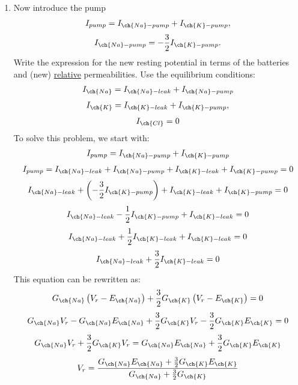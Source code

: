 \documentclass[11pt]{article}
\begin{document}
\begin{enumerate}[label=\arabic*.]
\begin{enumerate}[label=(\alph*)]
\newpage
\item
Now introduce the pump
\begin{align*}
I_{pump} = I_{\ch{Na}-pump} + I_{\ch{K}-pump},
\end{align*}
\begin{align*}
I_{\ch{Na}-pump} =  -\frac{3} {2} I_{\ch{K}-pump}.
\end{align*}
Write the expression for the new resting potential in terms of the batteries and (new) \underline{relative} permeabilities. Use the equilibrium conditions:
\begin{align*}
I_{\ch{Na}} = I_{\ch{Na}-leak} + I_{\ch{Na}-pump}
\end{align*}
\begin{align*}
I_{\ch{K}} = I_{\ch{K}-leak} + I_{\ch{K}-pump},
\end{align*}
\begin{align*}
I_{\ch{Cl}} = 0
\end{align*}
To solve this problem, we start with:
\begin{align*}
I_{pump} = I_{\ch{Na}-pump} + I_{\ch{K}-pump}
\end{align*}
\begin{align*}
I_{pump} = I_{\ch{Na}-leak} + I_{\ch{Na}-pump} + I_{\ch{K}-leak} + I_{\ch{K}-pump} = 0
\end{align*}
\begin{align*}
I_{\ch{Na}-leak} + \left(-\frac{3} {2} I_{\ch{K}-pump}\right) + I_{\ch{K}-leak} + I_{\ch{K}-pump} = 0
\end{align*}
\begin{align*}
I_{\ch{Na}-leak} - \frac{1} {2} I_{\ch{K}-pump} + I_{\ch{K}-leak} = 0
\end{align*}
\begin{align*}
I_{\ch{Na}-leak} + \frac{1} {2} I_{\ch{K}-leak} + I_{\ch{K}-leak} = 0
\end{align*}
\begin{align*}
I_{\ch{Na}-leak} + \frac{3} {2} I_{\ch{K}-leak} = 0
\end{align*}
This equation can be rewritten as:
\begin{align*}
G_{\ch{Na}} \left(V_r - E_{\ch{Na}}\right) + \frac{3} {2} G_{\ch{K}} \left(V_r - E_{\ch{K}}\right) = 0
\end{align*}
\begin{align*}
G_{\ch{Na}} V_r - G_{\ch{Na}} E_{\ch{Na}} + \frac{3} {2} G_{\ch{K}} V_r - \frac{3} {2} G_{\ch{K}} E_{\ch{K}} = 0
\end{align*}
\begin{align*}
G_{\ch{Na}} V_r + \frac{3} {2} G_{\ch{K}} V_r = G_{\ch{Na}} E_{\ch{Na}} + \frac{3} {2} G_{\ch{K}} E_{\ch{K}}
\end{align*}
\begin{align*}
V_r = \frac{G_{\ch{Na}} E_{\ch{Na}} + \frac{3} {2} G_{\ch{K}} E_{\ch{K}}} {G_{\ch{Na}} + \frac{3} {2} G_{\ch{K}}}
\end{align*}










\end{enumerate}
\end{enumerate}
\end{document}
